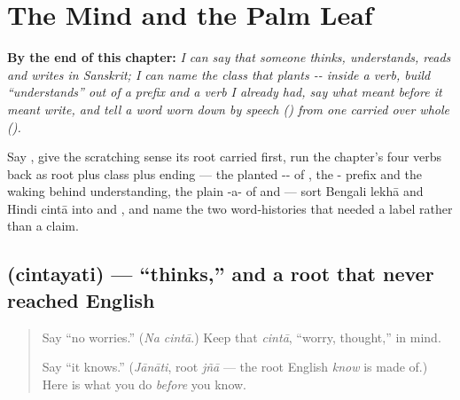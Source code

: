 
\chapter{The Mind and the Palm Leaf}
\label{ch:sa-mind-verbs}

\begin{chapteropening}
\textbf{By the end of this chapter:} \emph{I can say that someone thinks, understands, reads and writes in Sanskrit; I can name the class that plants -- inside a verb, build \textquotedblleft{}understands\textquotedblright{} out of a prefix and a verb I already had, say what  meant before it meant write, and tell a word worn down by speech () from one carried over whole ().}

Say , give the scratching sense its root carried first, run the chapter's four verbs back as root plus class plus ending — the planted -- of , the - prefix and the waking  behind understanding, the plain -a- of  and  — sort Bengali lekhā and Hindi cintā into  and , and name the two word-histories that needed a label rather than a claim.
\end{chapteropening}

\section[\texorpdfstring{\sk{चिन्तयति} (cintayati)}{चिन्तयति (cintayati)}]{ (cintayati) — \textquotedblleft{}thinks,\textquotedblright{} and a root that never reached English}

\label{lesson:SA-C08-cintayati}



\begin{quote}
Say \textquotedblleft{}no worries.\textquotedblright{} (\emph{Na cintā}.) Keep that \emph{cintā}, \textquotedblleft{}worry, thought,\textquotedblright{} in mind.

Say \textquotedblleft{}it knows.\textquotedblright{} (\emph{Jānāti}, root \emph{jñā} — the root English \emph{know} is made of.) Here is what you do \emph{before} you know.
\end{quote}


